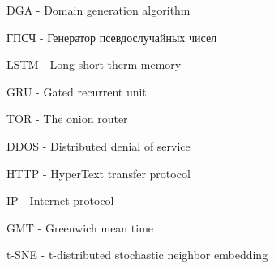 \noindent DGA - Domain generation algorithm

\noindent ГПСЧ - Генератор псевдослучайных чисел

\noindent LSTM - Long short-therm memory

\noindent GRU - Gated recurrent unit

\noindent TOR - The onion router

\noindent DDOS - Distributed denial of service

\noindent HTTP - HyperText transfer protocol

\noindent IP - Internet protocol

\noindent GMT - Greenwich mean time

\noindent t-SNE - t-distributed stochastic neighbor embedding
\clearpage